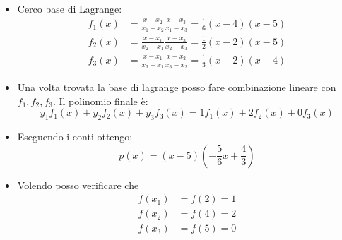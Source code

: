 \begin{itemize}
	\item Cerco base di Lagrange:
	      \begin{align*}
		      f_1 \left( x \right) & = \frac{x-x_2}{x_1-x_2} \frac{x-x_3}{x_1-x_3} =\frac{1}{6}\left( x-4 \right) \left( x-5 \right)  \\
		      f_2 \left( x \right) & = \frac{x-x_1}{x_2-x_1} \frac{x-x_3}{x_2-x_3} = \frac{1}{2}\left( x-2 \right) \left( x-5 \right) \\
		      f_3\left( x \right)  & = \frac{x-x_1}{x_3-x_1} \frac{x-x_2}{x_3-x_2}=\frac{1}{3}\left( x-2 \right) \left( x-4 \right)
	      \end{align*}
	\item Una volta trovata la base di lagrange posso fare combinazione lineare con $f_1, f_2, f_3$. Il polinomio finale è:
	      \[
		      y_1f_1\left( x \right)  + y_2f_2\left( x \right) + y_3f_3\left( x \right) = 1f_1\left( x \right) + 2f_2\left( x \right) + 0 f_3\left( x \right)
	      \]
	\item Eseguendo i conti ottengo:
	      \[
		      p\left( x \right) = \left( x-5 \right) \left( -\frac{5}{6}x + \frac{4}{3} \right)
	      \]
	\item Volendo posso verificare che
	      \begin{align*}
		      f\left( x_1 \right) & =  f\left( 2 \right) =1 \\
		      f\left( x_2 \right) & =  f\left( 4 \right) =2 \\
		      f\left( x_3 \right) & = f\left( 5 \right) =0
	      \end{align*}
\end{itemize}
